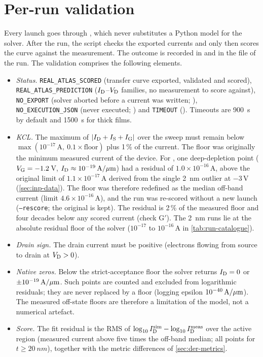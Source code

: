 \section{Per-run validation}\label{sec:num-validation}

Every launch goes through , which never substitutes a Python model for the solver. After the
run, the script checks the exported currents and only then scores the curve against the measurement. The outcome is
recorded in  and in the  file of the run. The validation comprises the
following elements.
\begin{itemize}
  \item \emph{Status.} \texttt{REAL\_ATLAS\_SCORED} (transfer curve exported, validated and scored),
        \texttt{REAL\_ATLAS\_PREDICTION} ($I_{\mathrm{D}}$--$V_{\mathrm{D}}$ families, no measurement to score against),
        \texttt{NO\_EXPORT} (solver aborted before a current was written; ),
        \texttt{NO\_EXECUTION\_JSON} (never executed; ) and \texttt{TIMEOUT} (). Timeouts are
        \SI{900}{s} by default and \SI{1500}{s} for thick films.
  \item \emph{KCL.} The maximum of $|I_{\mathrm{D}}+I_{\mathrm{S}}+I_{\mathrm{G}}|$ over the sweep must remain below
        $\max(10^{-17}\,\mathrm{A},\ 0.1\times\mathrm{floor})$ plus 1\,\% of the current. The floor was originally the
        minimum measured current of the device. For , one deep-depletion point ($V_{\mathrm{G}} = -1.2$\,V,
        $I_{\mathrm{D}} \approx 10^{-19}\,\mathrm{A}/\mu\mathrm{m}$) had a residual of $1.0\times10^{-16}$\,A, above the original limit of
        $1.1\times10^{-17}$\,A derived from the single \SI{2}{nm} outlier at $-3$\,V (\cref{sec:inp-data}). The floor was
        therefore redefined as the median off-band current (limit $4.6\times10^{-16}$\,A), and the run was re-scored
        without a new launch (\texttt{--rescore}; the original  is kept). The residual is 2\,\% of
        the measured floor and four decades below any scored current (check G$'$). The \SI{2}{nm} runs lie at the
        absolute residual floor of the solver ($10^{-17}$ to $10^{-16}$\,A in \cref{tab:run-catalogue}).
  \item \emph{Drain sign.} The drain current must be positive (electrons flowing from source to drain at
        $V_{\mathrm{D}} > 0$).
  \item \emph{Native zeros.} Below the strict-acceptance floor the solver returns $I_{\mathrm{D}} = 0$ or $\pm 10^{-19}\,\mathrm{A}/\mu\mathrm{m}$. Such
        points are counted and excluded from logarithmic residuals; they are never replaced by a floor (logging
        epsilon $10^{-40}\,\mathrm{A}/\mu\mathrm{m}$). The measured off-state floors are therefore a limitation of the model, not a numerical
        artefact.
  \item \emph{Score.} The fit residual is the RMS of $\log_{10}I_{\mathrm{D}}^{\mathrm{sim}} - \log_{10}I_{\mathrm{D}}^{\mathrm{meas}}$ over
        the active region (measured current above five times the off-band median; all points for $t \ge \SI{20}{nm}$),
        together with the metric differences of \cref{sec:der-metrics}.
\end{itemize}

